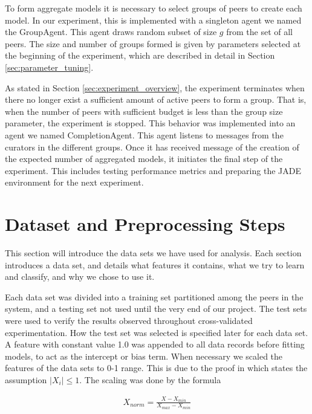 To form aggregate models it is necessary to select groups of peers to create each model. In our experiment, this is implemented with a singleton agent we named the GroupAgent. This agent draws random subset of size $g$ from the set of all peers. The size and number of groups formed is given by parameters selected at the beginning of the experiment, which are described in detail in Section \ref{sec:parameter_tuning}. 

As stated in Section \ref{sec:experiment_overview},  the experiment terminates when there no longer exist a sufficient amount of active peers to form a group. That is, when the number of peers with sufficient budget is less than the group size parameter, the experiment is stopped. This behavior was implemented into an agent we named CompletionAgent. This agent listens to messages from the curators in the different groups. Once it has received message of the creation of the expected number of aggregated models, it initiates the final step of the experiment. This includes testing performance metrics and preparing the JADE environment for the next experiment. 


\section{Dataset and Preprocessing Steps}
\label{sec:data sets}
This section will introduce the data sets we have used for analysis. Each section introduces a data set, and details what features it contains, what we try to learn and classify, and why we chose to use it.

Each data set was divided into a training set partitioned among the peers in the system, and a testing set not used until the very end of our project. The test sets were used to verify the results observed throughout cross-validated experimentation. How the test set was selected is specified later for each data set.
A feature with constant value 1.0 was appended to all data records before fitting models, to act as the intercept or bias term. When necessary we scaled the features of the data sets to 0-1 range. This is due to the proof in \citep{chaudhuri2009logistic} which states the assumption $|X_i|\leq 1$. The scaling was done by the formula

\begin{eqnarray}
X_{norm} = \frac{X-X_{min}}{X_{max} - X_{min}}
\end{eqnarray}

